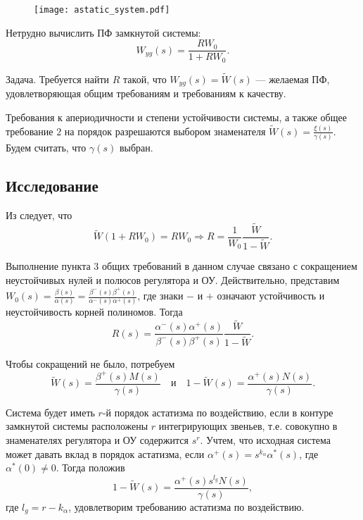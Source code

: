 \documentclass[../../TAU.tex]{subfiles}
\begin{document}
    \begin{figure}[h]
        \centering
        \texttt{[image: astatic\_system.pdf]}
    \end{figure}

    Нетрудно вычислить ПФ замкнутой системы:
    \begin{equation}\label{WYG}
        W_{yg}(s) = \frac{RW_0}{1+RW_0}.
    \end{equation}

    Задача. Требуется найти $R$ такой, что $W_{yg}(s) = \tilde W (s)$ --- желаемая ПФ, удовлетворяющая общим требованиям и требованиям к качеству.

    Требования к апериодичности и степени устойчивости системы, а также общее требование $2$ на порядок разрешаются выбором знаменателя $\tilde W(s) = \frac{\xi(s)}{\gamma(s)}$. Будем считать, что $\gamma(s)$ выбран.

\subsection{Исследование}

    Из  следует, что
    $$
        \tilde W(1+RW_0) = RW_0 \Longrightarrow R = \frac{1}{W_0}\frac{\tilde W}{1-\tilde W}.
    $$

    Выполнение пункта 3 общих требований в данном случае связано с сокращением неустойчивых нулей и полюсов регулятора и ОУ. Действительно, представим $W_0(s) = \frac{\beta(s)}{\alpha(s)} = \frac{\beta^-(s)\beta^+(s)}{\alpha^-(s)\alpha^+(s)}$, где знаки $-$ и $+$ означают устойчивость и неустойчивость корней полиномов. Тогда
    $$
        R(s) = \frac{\alpha^-(s)\alpha^+(s)}{\beta^-(s)\beta^+(s)}\frac{\tilde W}{1-\tilde W}.
    $$

    Чтобы сокращений не было, потребуем
    $$
        \tilde W(s) = \frac{\beta^+(s)M(s)}{\gamma(s)}\quad \text{и}\quad 1-\tilde W(s) = \frac{\alpha^+(s)N(s)}{\gamma(s)}.
    $$

    Система будет иметь $r$-й порядок астатизма по воздействию, если в контуре замкнутой системы расположены $r$ интегрирующих звеньев, т.е. совокупно в знаменателях регулятора и ОУ содержится $s^r$. Учтем, что исходная система может давать вклад в порядок астатизма, если  $\alpha^+(s) = s^{k_\alpha} \alpha^*(s)$, где $\alpha^*(0)\neq0$. Тогда положив
    \begin{equation}\label{EQ1}
        1-\tilde W(s) = \frac{\alpha^+(s)s^{l_g}N(s)}{\gamma(s)},
    \end{equation}
    где $l_g = r-k_\alpha$, удовлетворим требованию астатизма по воздействию.
\end{document}
